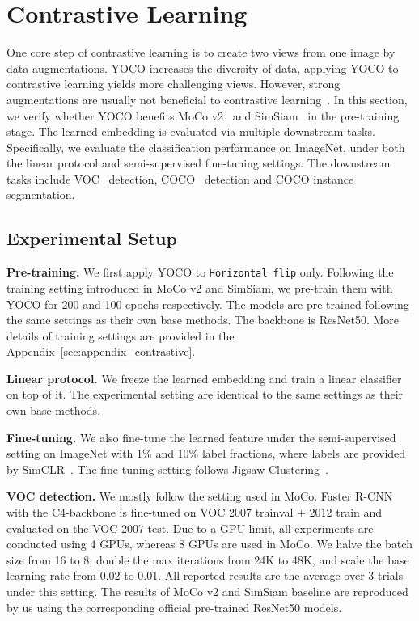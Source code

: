 \documentclass{article}
\begin{document}
\section{Contrastive Learning}

One core step of contrastive learning is to create two views from one image by data augmentations. YOCO increases the diversity of data, applying YOCO to contrastive learning yields more challenging views. However, strong augmentations are usually not beneficial to contrastive learning~\cite{chen2020simple}. In this section, we verify whether YOCO benefits MoCo v2~\cite{chen2020improved} and SimSiam~\cite{chen2021exploring} in the pre-training stage. The learned embedding is evaluated via multiple downstream tasks. Specifically, we evaluate the classification performance on ImageNet, under both the linear protocol and semi-supervised fine-tuning settings. The downstream tasks include VOC~\cite{everingham2010pascal} detection, COCO~\cite{lin2014microsoft} detection and COCO instance segmentation. 

\subsection{Experimental Setup}
\textbf{Pre-training.} 
We first apply YOCO to \texttt{Horizontal flip} only. Following the training setting introduced in MoCo v2 and SimSiam, we pre-train them with YOCO for 200 and 100 epochs respectively. The models are pre-trained following the same settings as their own base methods. The backbone is ResNet50. More details of training settings are provided in the Appendix~\ref{sec:appendix_contrastive}. 

\textbf{Linear protocol.}
We freeze the learned embedding and train a linear classifier on top of it. The experimental setting are identical to the same settings as their own base methods. 

\textbf{Fine-tuning.}
We also fine-tune the learned feature under the semi-supervised setting on ImageNet with 1\% and 10\% label fractions, where labels are provided by SimCLR~\cite{chen2020simple}. The fine-tuning setting follows Jigsaw Clustering~\cite{chen2021jigsaw}. 

\textbf{VOC detection. }
We mostly follow the setting used in MoCo. Faster R-CNN~\cite{ren2015faster} with the C4-backbone is fine-tuned on VOC 2007 trainval + 2012 train and evaluated on the VOC 2007 test. Due to a GPU limit, all experiments are conducted using 4 GPUs, whereas 8 GPUs are used in MoCo. We halve the batch size from 16 to 8, double the max iterations from 24K to 48K, and scale the base learning rate from 0.02 to 0.01. All reported results are the average over 3 trials under this setting. The results of MoCo v2 and SimSiam baseline are reproduced by us using the corresponding official pre-trained ResNet50 models.
\end{document}
